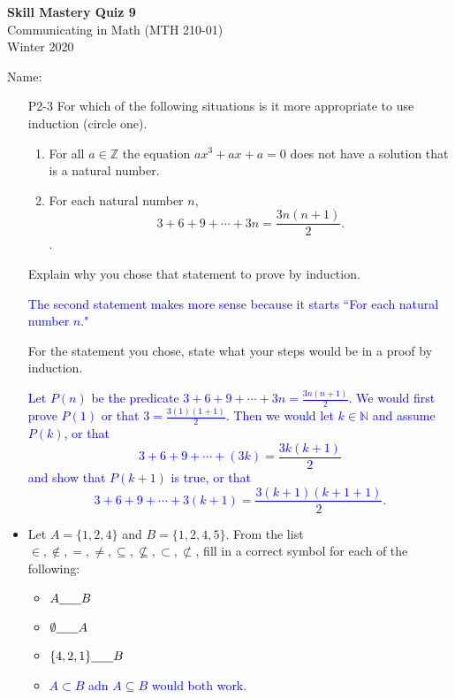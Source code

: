 \documentclass[10pt]{article}
\newcommand{\Z}{\mathbb{Z}}
\newcommand{\N}{\mathbb{N}}
\newcommand{\blue}{\textcolor{blue}}
\newcommand{\bs}{\begin{solution}}
\begin{document}
\vspace{-1.2in}
\begin{center} \textbf{\Large{Skill Mastery Quiz 9}} \\
Communicating in Math (MTH 210-01)\\
Winter 2020
\end{center}



\noindent Name: 




\begin{itemize}
	






\item [P2-3]  For which of the following situations is it more appropriate to use induction (circle one).
		\begin{enumerate}
		\item For all $a\in\Z$ the equation $ax^3+ax + a = 0$ does not have a solution that is a natural number.
		\item For each natural number $n$, \[3+6+9+\cdots +3n = \frac{3n(n+1)}{2}.\].
		\end{enumerate}
	Explain why you chose that statement to prove by induction.
	
	\bs \blue{The second statement makes more sense because it starts ``For each natural number $n$."}\end{solution}
	\vspace{1in}
	
	For the statement you chose, state what your steps would be in a proof by induction.
	
	\bs\blue{Let $P(n)$ be the predicate $3+6+9+\cdots+3n = \frac{3n(n+1)}{2}$. We would first prove $P(1)$ or that $3 = \frac{3(1)(1+1)}{2}$. Then we would let $k\in\N$ and assume $P(k)$, or that
	\[ 3+6+9+ \cdots + (3k) = \frac{3k(k+1)}{2}\]
and show that $P(k+1)$ is true, or that
	\[3+6+9+\cdots+3(k+1) = \frac{3(k+1)(k+1+1)}{2}.\]}\end{solution}
\vfill


\item[S1-2] Let $A = \{1,2,4\}$ and $B = \{1,2,4,5\}$.  From the list $\in, \notin, =,\neq,\subseteq,\not\subseteq,\subset,\not\subset$, fill in a correct symbol for each of the following:
		\begin{itemize}
		\item $A\underline{\hspace{.25in}} B$
		\item $\emptyset \underline{\hspace{.25in}} A$
		\item $\{4,2,1\} \underline{\hspace{.25in}} B$
		\end{itemize}
		\begin{itemize}
		\item \begin{solution} \blue{$A\subset B$ adn $A\subseteq B$ would both work.	}	\end{solution}


\end{itemize}
\end{itemize}
\end{document}
